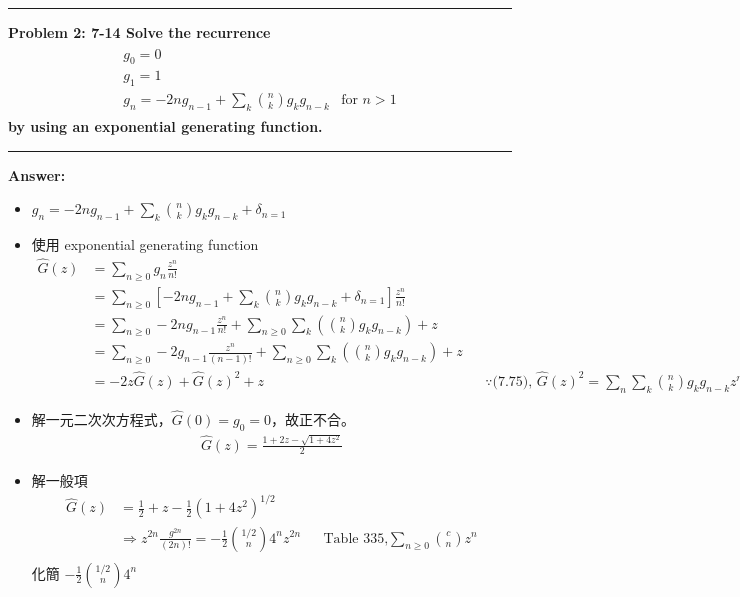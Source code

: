 \documentclass[11pt]{article}
\newcommand\question[2]{\vspace{.25in}\hrule\textbf{#1: #2}\vspace{.5em}\hrule\vspace{.10in}}
\renewcommand\part[1]{\vspace{.10in}\textbf{#1}}
\begin{document}
\question{Problem 2} {7-14 Solve the recurrence
	\begin{align*}
	\begin{matrix}
	g_0 = 0 & \\ 
	g_1 = 1 & \\
 	g_n = -2n g_{n-1} + \sum_{k} \binom{n}{k} g_k g_{n-k} & \text{for } n > 1
	\end{matrix}
	\end{align*}
	by using an exponential generating function.
}

\part{Answer:}

\begin{itemize}
	\item $g_n = -2n g_{n-1} + \sum_{k} \binom{n}{k} g_k g_{n-k} + \delta_{n=1}$
	\item 使用 exponential generating function
		\begin{align*}
			\widehat{G}(z) 
				&= \sum_{n \ge 0} g_n \frac{z^n}{n!} \\
				&= \sum_{n \ge 0} \left [ -2n g_{n-1} + \sum_{k} \binom{n}{k} g_k g_{n-k} + \delta_{n=1} \right ] \frac{z^n}{n!} \\
				&= \sum_{n \ge 0} -2n g_{n-1} \frac{z^n}{n!} + \sum_{n \ge 0} \sum_{k} \left ( \binom{n}{k} g_k g_{n-k} \right ) + z \\
				&= \sum_{n \ge 0} -2 g_{n-1} \frac{z^n}{(n-1)!} + \sum_{n \ge 0} \sum_{k} \left ( \binom{n}{k} g_k g_{n-k} \right ) + z\\
				&= -2 z \widehat{G}(z) + \widehat{G}(z)^2 + z 
				&& \because \text{(7.75), } \widehat{G}(z)^2 = \sum_n \sum_k \binom{n}{k} g_k g_{n-k} z^n
		\end{align*}
	\item 解一元二次次方程式，$\widehat{G}(0)= g_0 = 0$，故正不合。
		\begin{align*}
			\widehat{G}(z) = \frac{1+2z-\sqrt{1+4z^2}}{2}
		\end{align*}
	\item 解一般項 
		\begin{align*}
			\widehat{G}(z) &= \frac{1}{2} + z - \frac{1}{2}(1+4z^2)^{1/2} \\
			& \Rightarrow z^{2n} \frac{g^{2n}}{(2n)!} = - \frac{1}{2} \binom{1/2}{n} 4^n z^{2n} 
				&& \text{Table 335,} \sum_{n \ge 0} \binom{c}{n} z^n \\
		\end{align*}
		化簡 $- \frac{1}{2} \binom{1/2}{n} 4^n$

\end{itemize}
\end{document}
